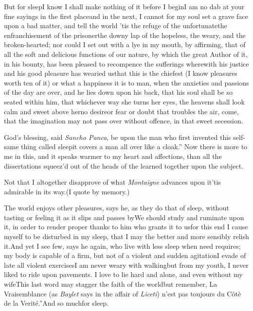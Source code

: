 \documentclass{article}
\begin{document}
But for sleep\tsk I know I shall make nothing of it before I begin\tsk I am no dab at
your fine sayings in the first place\break\tsk and in the
next, I cannot for my soul\pb
set a grave face upon a bad matter, and tell the world\tsk
’tis the refuge of the unfortunate\tsk the enfranchisement
of the prisoner\tsk the downy lap of the hopeless, the
weary, and the broken-hearted; nor could I set out with a
lye in my mouth, by affirming, that of all the soft and
delicious functions of our nature, by which the great Author
of it, in his bounty, has been pleased to recompence the
sufferings wherewith his justice and his good pleasure has
wearied us\tsh that this is the chiefest (I know pleasures
worth ten of it) or what a happiness it is to man, when the
anxieties and passions of the day are over, and he lies down
upon his back, that his soul shall be so seated within him,
that whichever way she turns her eyes, the heavens shall
look calm and sweet above her\tsk no desire\tsk or fear\tsk
or doubt that troubles the air,\pb{} come, that the imagination may not pass over
without offence, in that sweet secession.

\tsk\lqq God’s blessing, said \textit{Sancho Panca},\break
\lqq be upon the man who first invented\break
\lqq this self-same thing called sleep\tsk it\break
\lqq covers a man all over like a cloak.”\break
Now there is more to me in this, and it speaks warmer to my
heart and affections, than all the dissertations squeez’d out
of the heads of the learned together upon the subject.

\tsk Not that I altogether disapprove of what \textit{Montaigne} advances upon
it\tsk ’tis admirable in its way.\tsk (I quote by
memory.)

\newpage
The world enjoys other pleasures, says he, as they do that of
sleep, without tasting or feeling it as it slips and passes
by\tsk We should study and ruminate upon it, in order to render
proper thanks to him who grants it to us\tsk for this end I
cause myself to be disturbed in my sleep, that I may the better and
more sensibly relish it.\tsk And yet I see few, says he
again, who live with less sleep when need requires; my body is
capable of a firm, but not of a violent and sudden
agitation\tsk I evade of late all violent
exercises\tsk I am never weary with
walking\tsk but from my youth, I never liked to ride upon
pavements. I love to lie hard and alone, and even without my
wife\tsk This last word may stagger the faith of the
world\tsk but remember, \lqq La\break
\lqq Vraisemblance (as \textit{Baylet} says in the\break
\lqq affair of \textit{Liceti}) n’est pas toujours\pb
\lqq du Côtè de la Verité.”\quad And so much\break for sleep.
\end{document}
